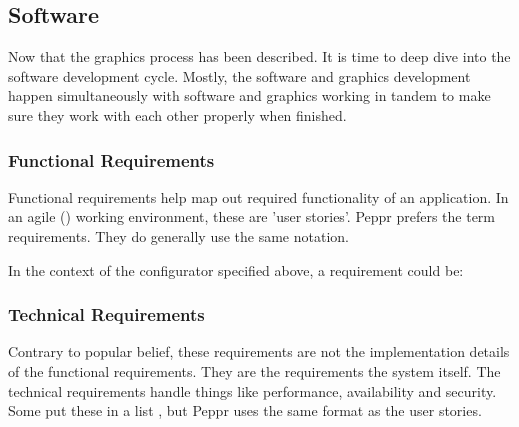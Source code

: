 \subsection{Software}
Now that the graphics process has been described. It is time to deep dive into the software development cycle. Mostly, the software and graphics development happen simultaneously with software and graphics working in tandem to make sure they work with each other properly when finished.
​
\subsubsection{Functional Requirements}
Functional requirements help map out required functionality of an application. In an agile (\cite{agileUserStories}) working environment, these are 'user stories'. Peppr prefers the term requirements. They do generally use the same notation. \newline

\newline

In the context of the configurator specified above, a requirement could be: \newline

\newline

\subsubsection{Technical Requirements}
Contrary to popular belief, these requirements are not the implementation details of the functional requirements. They are the requirements the system itself. The technical requirements handle things like performance, availability and security. Some put these in a list \cite{agileTechnicalRequirements}, but Peppr uses the same format as the user stories. \newline

